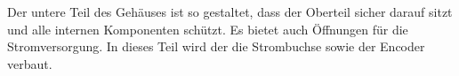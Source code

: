     
    Der untere Teil des Gehäuses ist so gestaltet, dass der Oberteil sicher darauf sitzt und alle internen
    Komponenten schützt. Es bietet auch Öffnungen für die Stromversorgung. In dieses Teil wird der 
    die Strombuchse sowie der Encoder verbaut.
   


    